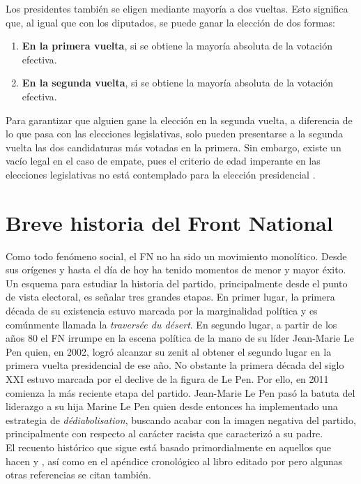 Los presidentes también se eligen mediante mayoría a dos vueltas. Esto significa que, al igual que con los diputados, se puede ganar la elección de dos formas: 

\begin{enumerate}
\item \textbf{En la primera vuelta}, si se obtiene la mayoría absoluta de la votación efectiva.  
\item \textbf{En la segunda vuelta}, si se obtiene la mayoría absoluta de la votación efectiva. 
\end{enumerate}

Para garantizar que alguien gane la elección en la segunda vuelta, a diferencia de lo que pasa con las elecciones legislativas, solo pueden presentarse a la segunda vuelta las dos candidaturas más votadas en la primera. Sin embargo, existe un vacío legal en el caso de empate, pues el criterio de edad imperante en las elecciones legislativas no está contemplado para la elección presidencial \parencite{Parisien16}.

\section{Breve historia del Front National}

Como todo fenómeno social, el FN no ha sido un movimiento monolítico. Desde sus orígenes y hasta el día de hoy ha tenido momentos de menor y mayor éxito. Un esquema para estudiar la historia del partido, principalmente desde el punto de vista electoral, es señalar tres grandes etapas. En primer lugar, la primera década de su existencia estuvo marcada por la marginalidad política y es comúnmente llamada la \textit{traversée du désert}. En segundo lugar, a partir de los años 80 el FN irrumpe en la escena política de la mano de su líder Jean-Marie Le Pen quien, en 2002, logró alcanzar su zenit al obtener el segundo lugar en la primera vuelta presidencial de ese año. No obstante la primera década del siglo XXI estuvo marcada por el declive de la figura de Le Pen. Por ello, en 2011 comienza la más reciente etapa del partido. Jean-Marie Le Pen pasó la batuta del liderazgo a su hija Marine Le Pen quien desde entonces ha implementado una estrategia de \textit{dédiabolisation}, buscando acabar con la imagen negativa del partido, principalmente con respecto al carácter racista que caracterizó a su padre.\\ 

El recuento histórico que sigue está basado primordialmente en aquellos que hacen \textcite{Hainsworth16b} y \textcite{Stockemer17}, así como en el apéndice cronológico al libro editado por \textcite{CreponEtAl15} pero algunas otras referencias se citan también.

